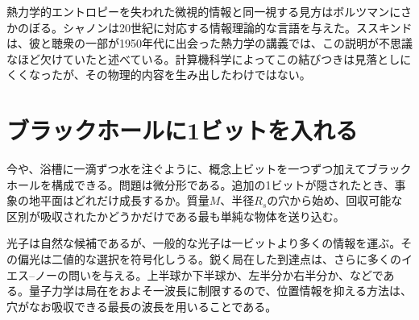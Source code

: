 熱力学的エントロピーを失われた微視的情報と同一視する見方はボルツマンにさかのぼる。シャノンは20世紀に対応する情報理論的な言語を与えた。ススキンドは、彼と聴衆の一部が1950年代に出会った熱力学の講義では、この説明が不思議なほど欠けていたと述べている。計算機科学によってこの結びつきは見落としにくくなったが、その物理的内容を生み出したわけではない。

\section{ブラックホールに1ビットを入れる}

今や、浴槽に一滴ずつ水を注ぐように、概念上ビットを一つずつ加えてブラックホールを構成できる。問題は微分形である。追加の1ビットが隠されたとき、事象の地平面はどれだけ成長するか。質量\(M\)、半径\(R_s\)の穴から始め、回収可能な区別が吸収されたかどうかだけである最も単純な物体を送り込む。

\begin{classroomqa}
\end{classroomqa}

光子は自然な候補であるが、一般的な光子は一ビットより多くの情報を運ぶ。その偏光は二値的な選択を符号化しうる。鋭く局在した到達点は、さらに多くのイエス--ノーの問いを与える。上半球か下半球か、左半分か右半分か、などである。量子力学は局在をおよそ一波長に制限するので、位置情報を抑える方法は、穴がなお吸収できる最長の波長を用いることである。

\begin{classroomqa}
\end{classroomqa}

\begin{classroomqa}
\end{classroomqa}

